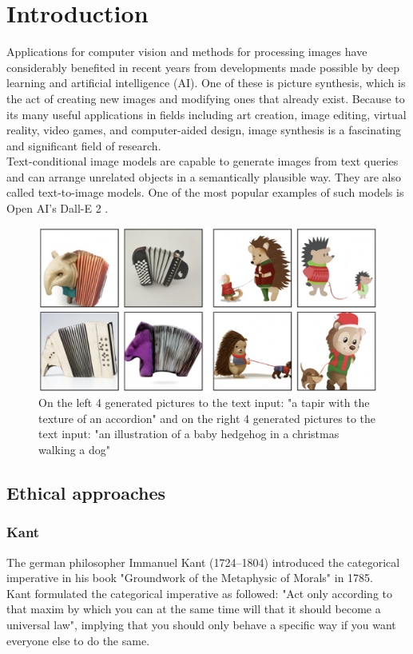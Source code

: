 \documentclass[11pt]{article}
\begin{document}
\section{Introduction}
Applications for computer vision and methods for processing images have considerably benefited in recent years from developments made possible by deep learning and artificial intelligence (AI). One of these is picture synthesis, which is the act of creating new images and modifying ones that already exist. Because to its many useful applications in fields including art creation, image editing, virtual reality, video games, and computer-aided design, image synthesis is a fascinating and significant field of research.\\
Text-conditional image models are capable to generate images from text queries and can arrange unrelated objects in a semantically plausible way. They are also called text-to-image models.
One of the most popular examples of such models is Open AI's Dall-E 2 \cite{DallE}
.

\begin{figure} [h]
	\includegraphics[width = 1\linewidth]{images/DallEExample.png}
	\caption{On the left 4 generated pictures to the text input: "a tapir with the texture of an accordion" and on the right 4 generated pictures to the text input: "an illustration of a baby hedgehog in a christmas walking a dog" \cite{zeroShot}}
	\label{example}
\end{figure}

\subsection{Ethical approaches}

\subsubsection{Kant}
The german philosopher Immanuel Kant (1724--1804) introduced the categorical imperative in his book "Groundwork of the Metaphysic of Morals" in 1785. \\
Kant formulated the categorical imperative as followed: "Act only according to that maxim by which you can at the same time will that it should become a universal law", implying that you should only behave a specific way if you want everyone else to do the same.
\end{document}
